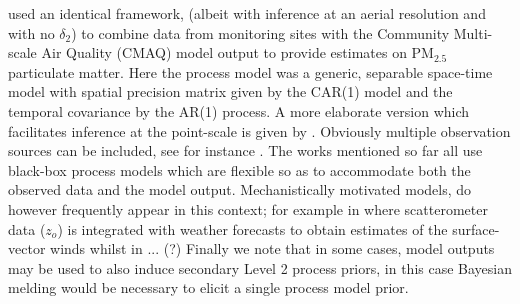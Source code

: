 \documentclass[10pt,a4paper]{article}
\begin{document}
\noindent \cite{McMillan_2010} used an identical framework, (albeit with inference at an aerial resolution and with no $\delta_2$) to combine data from monitoring sites with the Community Multi-scale Air Quality (CMAQ) model output to provide estimates on PM$_{2.5}$ particulate matter. Here the process model was a generic, separable space-time model with spatial precision matrix given by the CAR(1) model \citep{Rue_2005} and the temporal covariance by the AR(1) process. A more elaborate version which facilitates inference at the point-scale is given by \cite{Sahu_2010}. Obviously multiple observation sources can be included, see for instance \cite{Smith_2007}. The works mentioned so far all use black-box process models which are flexible so as to accommodate both the observed data and the model output. Mechanistically motivated models, do however frequently appear in this context; for example in \citep{Milliff_2011} where scatterometer data ($z_o$) is integrated with weather forecasts to obtain estimates of the surface-vector winds whilst in ... (?) Finally we note that in some cases, model outputs may be used to also induce secondary Level 2 process priors, in this case Bayesian melding \citep{Poole_2000} would be necessary to elicit a single process model prior. 
\end{document}
